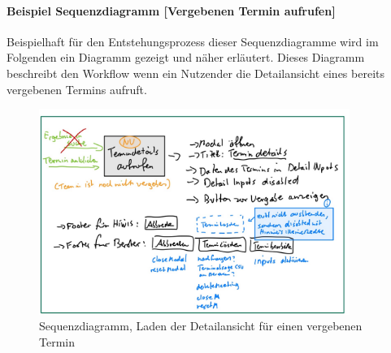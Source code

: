 \documentclass[12pt]{article}
\begin{document}
\paragraph{Beispiel Sequenzdiagramm [Vergebenen Termin aufrufen]}
Beispielhaft für den Entstehungsprozess dieser Sequenzdiagramme wird im
Folgenden ein Diagramm gezeigt und näher erläutert. Dieses Diagramm beschreibt
den Workflow wenn ein Nutzender die Detailansicht eines bereits vergebenen
Termins aufruft.

\begin{figure}[h]
    \caption{Sequenzdiagramm, Laden der Detailansicht für einen vergebenen Termin}
    \centering
    \includegraphics[width=0.9\textwidth]{flow_termin_aufrufen_unvergeben.jpeg}
\end{figure}
\end{document}

